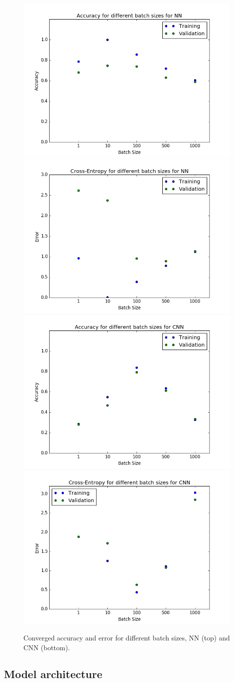 \documentclass[12pt]{article}
\begin{document}
\begin{figure}[!htb]
\centering
\includegraphics[width=0.4\linewidth]{32/batch/nn/Accuracy.png}
\includegraphics[width=0.4\linewidth]{32/batch/nn/Error.png}
\includegraphics[width=0.4\linewidth]{32/batch/cnn/Accuracy.png}
\includegraphics[width=0.4\linewidth]{32/batch/cnn/Error.png}
\vspace{-0.1in}
\caption{Converged accuracy and error for different batch sizes, NN (top) and CNN (bottom).}
\label{f32b}
\vspace{-0.1in}
\end{figure}



\subsection{Model architecture}
\end{document}
